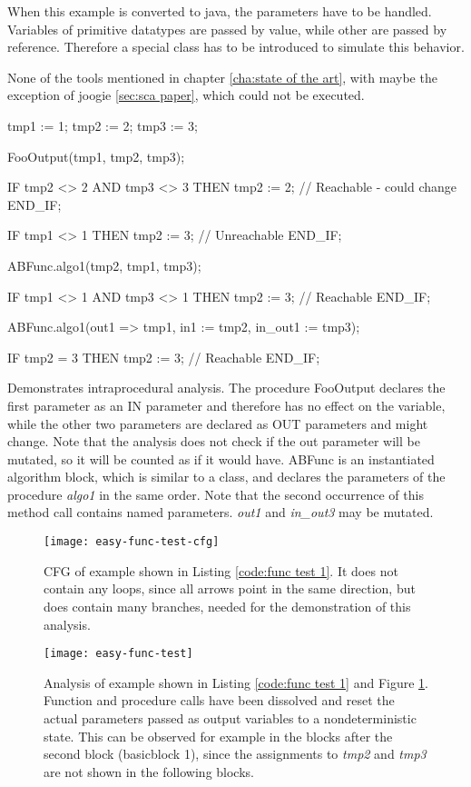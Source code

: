When this example is converted to java, the parameters have to be handled. Variables of primitive datatypes are passed by value, while other are passed by reference. Therefore a special class has to be introduced to simulate this behavior. 

None of the tools mentioned in chapter \ref{cha:state of the art}, with maybe the exception of joogie \ref{sec:sca paper}, which could not be executed.


\begin{program}[h!]
	\begin{GenericCode}
tmp1 := 1;
tmp2 := 2;
tmp3 := 3;

FooOutput(tmp1, tmp2, tmp3);

IF tmp2 <> 2 AND tmp3 <> 3 THEN
	tmp2 := 2; // Reachable - could change
END_IF;

IF tmp1 <> 1 THEN
	tmp2 := 3; // Unreachable
END_IF;

ABFunc.algo1(tmp2, tmp1, tmp3);

IF tmp1 <> 1 AND tmp3 <> 1 THEN
	tmp2 := 3; // Reachable
END_IF;

ABFunc.algo1(out1 => tmp1, in1 := tmp2, in_out1 := tmp3);

IF tmp2 = 3 THEN
	tmp2 := 3; // Reachable
END_IF;	\end{GenericCode}
	\centering
	\caption{Demonstrates intraprocedural analysis. The procedure  FooOutput declares the first parameter as an IN parameter and therefore has no effect on the variable, while the other two parameters are declared as OUT parameters and might change. Note that the analysis does not check if the out parameter will be mutated, so it will be counted as if it would have. ABFunc is an instantiated algorithm block, which is similar to a class, and declares the parameters of the procedure \emph{algo1} in the same order. Note that the second occurrence of this method call contains named parameters. \emph{out1} and \emph{in\_out3} may be mutated.}
	\label{code:func test 1}
\end{program}
\begin{figure}[h!]
	\centering
	\texttt{[image: easy-func-test-cfg]}
	\caption{CFG of example shown in Listing \ref{code:func test 1}. It does not contain any loops, since all arrows point in the same direction, but does contain many branches, needed for the demonstration of this analysis.}
	\label{fig:func test 1 cfg}
\end{figure}
\begin{figure}[h!]
	\centering
	\texttt{[image: easy-func-test]}
	\caption{Analysis of example shown in Listing \ref{code:func test 1} and Figure \ref{fig:func test 1 cfg}. Function and procedure calls have been dissolved and reset the actual parameters passed as output variables to a nondeterministic state. This can be observed for example in the blocks after the second block (basicblock 1), since the assignments to \emph{tmp2} and \emph{tmp3} are not shown in the following blocks.}
	\label{fig:func test 1}
\end{figure}

